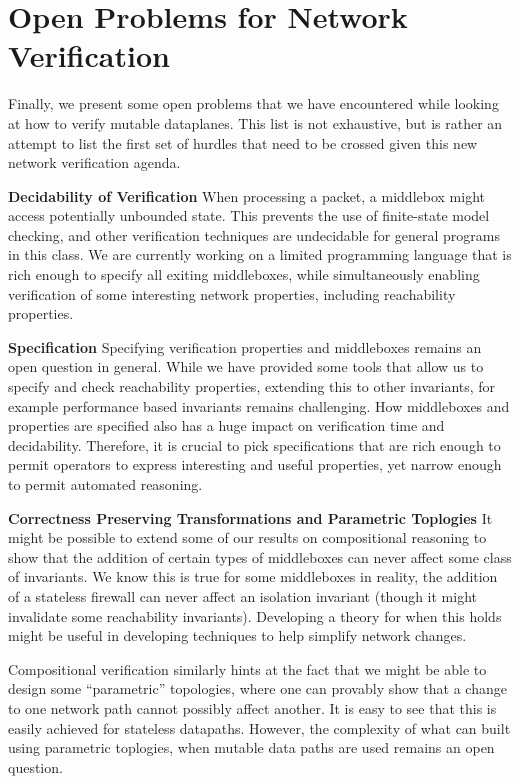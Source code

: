 \section{Open Problems for Network Verification}
Finally, we present some open problems that we have encountered while looking at how to verify mutable dataplanes. This list is not 
exhaustive, but is rather an attempt to list the first set of hurdles that need to be crossed given this new network verification agenda.

\textbf{Decidability of Verification} 
When processing a packet, a middlebox might access potentially unbounded state. This prevents the use
of finite-state model checking, and other verification techniques are undecidable for general programs in this class. We are
currently working on a limited programming language that is rich enough to specify all exiting middleboxes, while simultaneously
enabling verification of some interesting network properties, including reachability properties.



\textbf{Specification}
Specifying verification properties and middleboxes remains an open question in general. While we have provided some tools
that allow us to specify and check reachability properties, extending this to other invariants, for example performance based
invariants remains challenging. How middleboxes and properties are specified also has a huge impact on verification time and
decidability. Therefore, it is crucial to pick specifications that are rich enough to permit operators to express interesting and
useful properties, yet narrow enough to permit automated reasoning.

\textbf{Correctness Preserving Transformations and Parametric Toplogies}
It might be possible to extend some of our results on compositional reasoning to show that the addition of certain types of middleboxes
can never affect some class of invariants. We know this is true for some middleboxes in reality, the addition of a stateless firewall
can never affect an isolation invariant (though it might invalidate some reachability invariants). Developing a theory for when this 
holds might be useful in developing techniques to help simplify network changes. 

Compositional verification similarly hints at the fact that we might be able to design some ``parametric'' topologies, where one can provably
show that a change to one network path cannot possibly affect another. It is easy to see that this is easily achieved for stateless datapaths.
However, the complexity of what can built using parametric toplogies, when mutable data paths are used remains an open question.